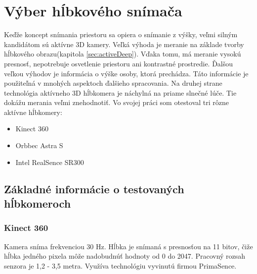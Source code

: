 
\section{Výber hĺbkového snímača}
Keďže  koncept snímania priestoru sa opiera o snímanie z výšky, veľmi silným kandidátom sú aktívne 3D kamery. Veľká výhoda je meranie na základe tvorby hĺbkového obrazu(kapitola \ref{sec:activeDeep}). Vďaka tomu, má meranie vysokú presnosť, nepotrebuje osvetlenie priestoru ani kontrastné prostredie.  Ďalšou veľkou výhodov je informácia o výške osoby, ktorá prechádza. Táto informácie je použiteľná v mnohých aspektoch ďalšieho spracovania. Na druhej strane technológia aktívneho 3D hĺbkomera je náchylná na priame slnečné lúče. Tie dokážu merania veľmi znehodnotiť. Vo svojej práci som otestoval tri rôzne aktívne hĺbkomery: 

\begin{itemize}
\item Kinect 360
\item Orbbec Astra S
\item Intel RealSence SR300

\end{itemize}


\subsection{Základné informácie o testovaných hĺbkomeroch}
\subsubsection{Kinect 360}
Kamera sníma frekvenciou 30 Hz. Hĺbka je snímaná s presnosťou na 11 bitov, čiže hĺbka jedného pixela môže nadobudnúť hodnoty od 0 do 2047.  Pracovný rozsah senzora je  1,2 - 3,5 metra.  Využíva technológiu vyvinutú firmou PrimaSence.%

